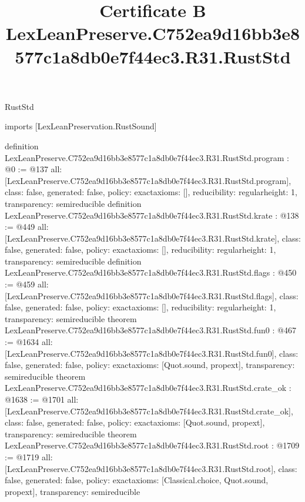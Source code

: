 \begin{lexlean}{RustStd}
\title{Certificate B LexLeanPreserve.C752ea9d16bb3e8577c1a8db0e7f44ec3.R31.RustStd}
\begin{coremodule}
imports [LexLeanPreservation.RustSound]

definition LexLeanPreserve.C752ea9d16bb3e8577c1a8db0e7f44ec3.R31.RustStd.program : @0 := @137 {
  all: [LexLeanPreserve.C752ea9d16bb3e8577c1a8db0e7f44ec3.R31.RustStd.program],
  class: false,
  generated: false,
  policy: exact{axioms: []},
  reducibility: regular{height: 1},
  transparency: semireducible
}
definition LexLeanPreserve.C752ea9d16bb3e8577c1a8db0e7f44ec3.R31.RustStd.krate : @138 := @449 {
  all: [LexLeanPreserve.C752ea9d16bb3e8577c1a8db0e7f44ec3.R31.RustStd.krate],
  class: false,
  generated: false,
  policy: exact{axioms: []},
  reducibility: regular{height: 1},
  transparency: semireducible
}
definition LexLeanPreserve.C752ea9d16bb3e8577c1a8db0e7f44ec3.R31.RustStd.flags : @450 := @459 {
  all: [LexLeanPreserve.C752ea9d16bb3e8577c1a8db0e7f44ec3.R31.RustStd.flags],
  class: false,
  generated: false,
  policy: exact{axioms: []},
  reducibility: regular{height: 1},
  transparency: semireducible
}
theorem LexLeanPreserve.C752ea9d16bb3e8577c1a8db0e7f44ec3.R31.RustStd.fun0 : @467 := @1634 {
  all: [LexLeanPreserve.C752ea9d16bb3e8577c1a8db0e7f44ec3.R31.RustStd.fun0],
  class: false,
  generated: false,
  policy: exact{axioms: [Quot.sound, propext]},
  transparency: semireducible
}
theorem LexLeanPreserve.C752ea9d16bb3e8577c1a8db0e7f44ec3.R31.RustStd.crate_ok : @1638 := @1701 {
  all: [LexLeanPreserve.C752ea9d16bb3e8577c1a8db0e7f44ec3.R31.RustStd.crate_ok],
  class: false,
  generated: false,
  policy: exact{axioms: [Quot.sound, propext]},
  transparency: semireducible
}
theorem LexLeanPreserve.C752ea9d16bb3e8577c1a8db0e7f44ec3.R31.RustStd.root : @1709 := @1719 {
  all: [LexLeanPreserve.C752ea9d16bb3e8577c1a8db0e7f44ec3.R31.RustStd.root],
  class: false,
  generated: false,
  policy: exact{axioms: [Classical.choice, Quot.sound, propext]},
  transparency: semireducible
}


\end{coremodule}
\end{lexlean}
